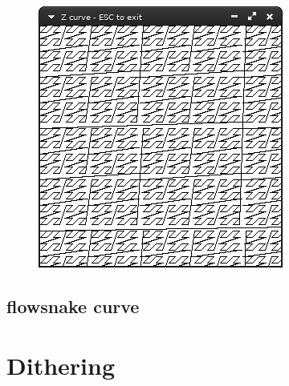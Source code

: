\documentclass[12pt,openany,a4,usenames,dvipsnames]{book}
\begin{document}
\begin{figure}[H]
  \centering
  \includegraphics[keepaspectratio,scale=1]{figures/zcurve.png}
\end{figure}
\section{flowsnake curve}
\skelpar%
\chapter{Dithering}
\skelpar%
\end{document}
